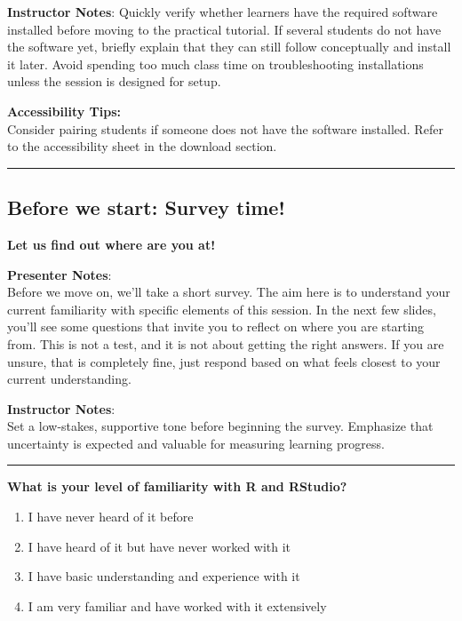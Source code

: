\documentclass[
  letterpaper,
  DIV=11,
  numbers=noendperiod]{scrartcl}
\begin{document}
\textbf{Instructor Notes}: Quickly verify whether learners have the
required software installed before moving to the practical tutorial. If
several students do not have the software yet, briefly explain that they
can still follow conceptually and install it later. Avoid spending too
much class time on troubleshooting installations unless the session is
designed for setup.

\textbf{Accessibility Tips:}\\
Consider pairing students if someone does not have the software
installed. Refer to the accessibility sheet in the download section.

\begin{center}\rule{0.5\linewidth}{0.5pt}\end{center}

\subsection{Before we start: Survey
time!}\label{before-we-start-survey-time}

\textbf{Let us find out where are you at!}

\textbf{Presenter Notes}:\\
Before we move on, we'll take a short survey. The aim here is to
understand your current familiarity with specific elements of this
session. In the next few slides, you'll see some questions that invite
you to reflect on where you are starting from. This is not a test, and
it is not about getting the right answers. If you are unsure, that is
completely fine, just respond based on what feels closest to your
current understanding.

\textbf{Instructor Notes}:\\
Set a low-stakes, supportive tone before beginning the survey. Emphasize
that uncertainty is expected and valuable for measuring learning
progress.

\begin{center}\rule{0.5\linewidth}{0.5pt}\end{center}

\textbf{What is your level of familiarity with R and RStudio?}

\begin{enumerate}
\def\labelenumi{\alph{enumi}.}
\item
  I have never heard of it before
\item
  I have heard of it but have never worked with it
\item
  I have basic understanding and experience with it
\item
  I am very familiar and have worked with it extensively
\end{enumerate}
\end{document}
